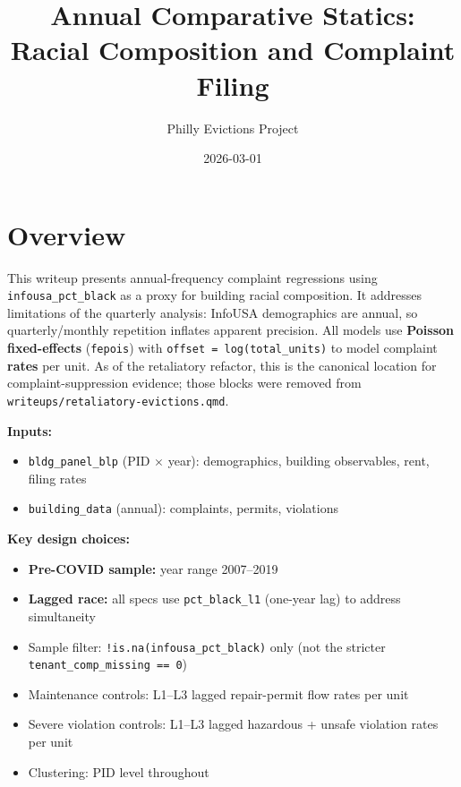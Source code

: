 \documentclass[
  10pt,
]{article}
\title{Annual Comparative Statics: Racial Composition and Complaint
Filing}
\author{Philly Evictions Project}
\date{2026-03-01}
\providecommand{\tightlist}{%
  \setlength{\itemsep}{0pt}\setlength{\parskip}{0pt}}
\renewcommand*\contentsname{Table of contents}
\newcommand\contentsname{Table of contents}
\begin{document}
\maketitle

\renewcommand*\contentsname{Table of contents}
{
\hypersetup{linkcolor=}
\setcounter{tocdepth}{3}
\tableofcontents
}

\section{Overview}\label{overview}

This writeup presents annual-frequency complaint regressions using
\texttt{infousa\_pct\_black} as a proxy for building racial composition.
It addresses limitations of the quarterly analysis: InfoUSA demographics
are annual, so quarterly/monthly repetition inflates apparent precision.
All models use \textbf{Poisson fixed-effects} (\texttt{fepois}) with
\texttt{offset\ =\ log(total\_units)} to model complaint \textbf{rates}
per unit. As of the retaliatory refactor, this is the canonical location
for complaint-suppression evidence; those blocks were removed from
\texttt{writeups/retaliatory-evictions.qmd}.

\textbf{Inputs:}

\begin{itemize}
\tightlist
\item
  \texttt{bldg\_panel\_blp} (PID \(\times\) year): demographics,
  building observables, rent, filing rates
\item
  \texttt{building\_data} (annual): complaints, permits, violations
\end{itemize}

\textbf{Key design choices:}

\begin{itemize}
\tightlist
\item
  \textbf{Pre-COVID sample:} year range 2007--2019
\item
  \textbf{Lagged race:} all specs use \texttt{pct\_black\_l1} (one-year
  lag) to address simultaneity
\item
  Sample filter: \texttt{!is.na(infousa\_pct\_black)} only (not the
  stricter \texttt{tenant\_comp\_missing\ ==\ 0})
\item
  Maintenance controls: L1--L3 lagged repair-permit flow rates per unit
\item
  Severe violation controls: L1--L3 lagged hazardous + unsafe violation
  rates per unit
\item
  Clustering: PID level throughout
\end{itemize}
\end{document}
